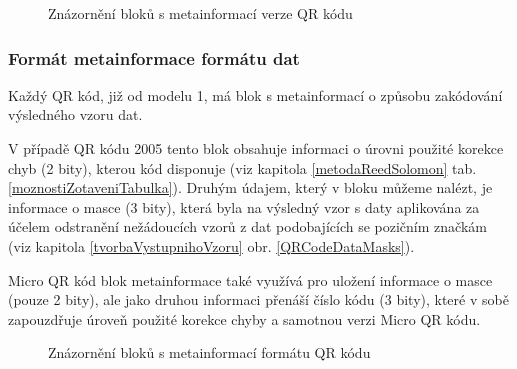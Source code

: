 \begin{figure}[H]
  \begin{center}
    \caption{Znázornění bloků s metainformací verze QR kódu}
    \label{QRCodeVersionMetainformation}
  \end{center}
\end{figure}

\subsubsection{Formát metainformace formátu dat}
\label{metainfoFormatEncoding}

Každý QR kód, již od modelu 1, má blok s metainformací o způsobu zakódování
výsledného vzoru dat. 

V případě QR kódu 2005 tento blok obsahuje informaci o 
úrovni použité korekce chyb (2 bity), kterou kód disponuje (viz kapitola 
\ref{metodaReedSolomon} tab. \ref{moznostiZotaveniTabulka}). Druhým údajem,
který v bloku můžeme nalézt, je informace o masce (3 bity), která byla na
výsledný vzor s daty aplikována za účelem odstranění nežádoucích vzorů z dat
podobajících se pozičním značkám (viz kapitola \ref{tvorbaVystupnihoVzoru} obr.
\ref{QRCodeDataMasks}).

Micro QR kód blok metainformace také využívá 
pro uložení informace o masce (pouze 2 bity), ale jako druhou informaci přenáší 
číslo kódu (3 bity), které v sobě zapouzdřuje úroveň použité korekce chyby a 
samotnou verzi Micro QR kódu.

\begin{figure}[H]
  \begin{center}
    \caption{Znázornění bloků s metainformací formátu QR kódu}
    \label{QRCodeFormatMetainformation}
  \end{center}
\end{figure}

